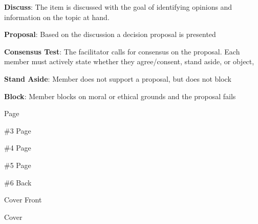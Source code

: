 \documentclass{article}
\begin{document}
	\begin{center}
	\end{center}
	 \newpage%
	
	\textbf{Discuss}: The item is discussed with the goal of identifying opinions and information on the topic at hand.
	
	\textbf{Proposal}: Based on the discussion a decision proposal is presented
	
	\textbf{Consensus Test}: The facilitator calls for consensus on the proposal. Each member must actively state whether they agree/consent, stand aside, or object,
	
	\textbf{Stand Aside}: Member does not support a proposal, but does not block
	
	\textbf{Block}: Member blocks on moral or ethical grounds and the proposal fails
	
	\newpage
	Page\par \#3\newpage
	Page\par \#4\newpage
	Page\par \#5\newpage
	Page\par \#6\newpage
	Back\par Cover \thispagestyle{empty} \newpage
	Front\par Cover \thispagestyle{empty} \newpage
\end{document}
